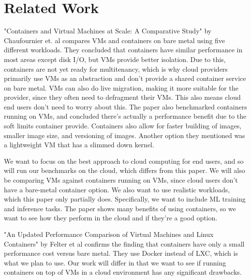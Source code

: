 \documentclass[11pt]{article}
\begin{document}
\section{Related Work}


"Containers and Virtual Machines at Scale: A Comparative Study" by Chaufournier et. al compares VMs and containers on bare metal using five different workloads.
They concluded that containers have similar performance in most areas except disk I/O, but VMs provide better isolation.
Due to this, containers are not yet ready for multitenancy, which is why cloud providers primarily use VMs as an abstraction and don't provide a shared container service on bare metal. VMs can also do live migration, making it more suitable for the provider, since they often need to defragment their VMs.
This also means cloud end users don't need to worry about this. The paper also benchmarked containers running on VMs, and concluded there's actually a performance benefit due to the soft limits container provide. Containers also allow for faster building of images, smaller image size, and versioning of images. Another option they mentioned was a lightweight VM that has a slimmed down kernel.

We want to focus on the best approach to cloud computing for end users, and so will run our benchmarks on the cloud, which differs from this paper. We will also be comparing VMs against containers running on VMs, since cloud users don't have a bare-metal container option. We also want to use realistic workloads, which this paper only partially does. Specifically, we want to include ML training and inference tasks. The paper shows many benefits of using containers, so we want to see how they perform in the cloud and if they're a good option.

"An Updated Performance Comparison of Virtual Machines and Linux Containers" by Felter et al confirms the finding that containers have only a small performance cost versus bare metal. They use Docker instead of LXC, which is what we plan to use. Our work will differ in that we want to see if running containers on top of VMs in a cloud environment has any significant drawbacks.
\end{document}
